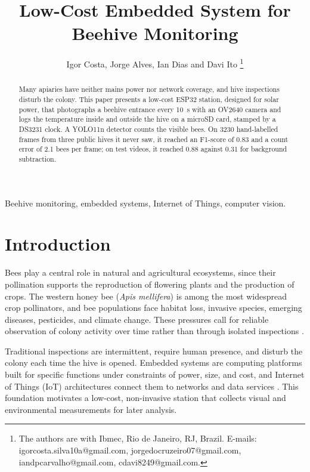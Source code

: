 \documentclass[english,hidelinks]{sbrt}
\begin{document}
\title{Low-Cost Embedded System for Beehive Monitoring}

\author{Igor Costa, Jorge Alves, Ian Dias and Davi Ito
  \thanks{The authors are with Ibmec, Rio de Janeiro, RJ, Brazil.
  E-mails: igorcosta.silva10a@gmail.com,
  jorgedocruzeiro07@gmail.com,
  iandpcarvalho@gmail.com,
  cdavi8249@gmail.com.}%
  }

\maketitle


\begin{abstract}
Many apiaries have neither mains power nor network coverage, and hive inspections disturb the colony. This paper presents a low-cost ESP32 station, designed for solar power, that photographs a beehive entrance every 10~s with an OV2640 camera and logs the temperature inside and outside the hive on a microSD card, stamped by a DS3231 clock. A YOLO11n detector counts the visible bees. On 3230 hand-labelled frames from three public hives it never saw, it reached an F1-score of 0.83 and a count error of 2.1 bees per frame; on test videos, it reached 0.88 against 0.31 for background subtraction.
\end{abstract}
\begin{keywords}
Beehive monitoring, embedded systems, Internet of Things, computer vision.
\end{keywords}

\section{Introduction}

Bees play a central role in natural and agricultural ecosystems, since their pollination supports the reproduction of flowering plants and the production of crops. The western honey bee (\textit{Apis mellifera}) is among the most widespread crop pollinators, and bee populations face habitat loss, invasive species, emerging diseases, pesticides, and climate change. These pressures call for reliable observation of colony activity over time rather than through isolated inspections \cite{hung2018pollinators,brown2009conservation}.

Traditional inspections are intermittent, require human presence, and disturb the colony each time the hive is opened. Embedded systems are computing platforms built for specific functions under constraints of power, size, and cost, and Internet of Things (IoT) architectures connect them to networks and data services \cite{demicco2020embedded,ray2018iotarchitectures}. This foundation motivates a low-cost, non-invasive station that collects visual and environmental measurements for later analysis.
\end{document}
